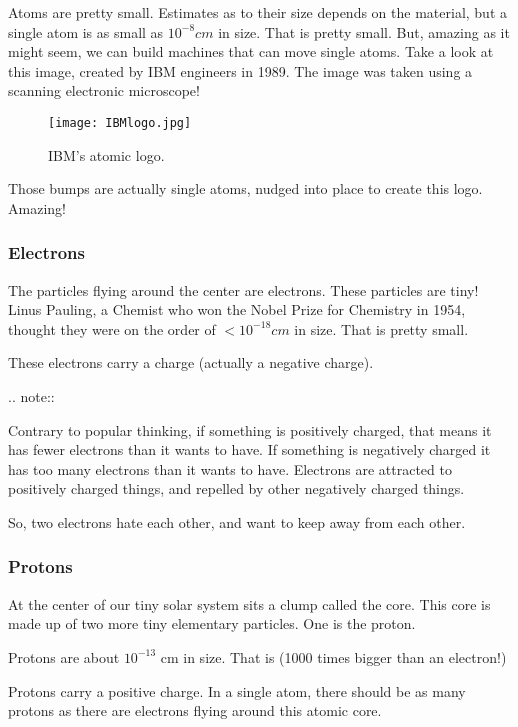 Atoms are pretty small. Estimates as to their size depends on the material, but
a single atom is as small as $10^{-8}cm$ in size. That is pretty small.
But, amazing as it might seem, we can build machines that can move single
atoms. Take a look at this image, created by IBM engineers in 1989. The image
was taken using a scanning electronic microscope!

\begin{figure}[ht]
  \caption{IBM's atomic logo.}
  \centering
  \texttt{[image: IBMlogo.jpg]}
\end{figure}

Those bumps are actually single atoms, nudged into place to create this logo.
Amazing!

\subsubsection{Electrons}

The particles flying around the center are electrons.  These particles are
tiny! Linus Pauling, a Chemist who won the Nobel Prize for Chemistry in 1954,
thought they were on the order of $< 10^{-18}cm$ in size. That is pretty
small.

These electrons carry a charge (actually a negative charge). 

..  note::

    Contrary to popular thinking, if something is positively charged, that
    means it has fewer electrons than it wants to have. If something is
    negatively charged it has too many electrons than it wants to have.
    Electrons are attracted to positively charged things, and repelled
    by other negatively charged things.

    So, two electrons hate each other, and want to keep away from each
    other.

\subsubsection{Protons}

At the center of our tiny solar system sits a clump called the core. This
core is made up of two more tiny elementary particles. One is the
proton.

Protons are about $10^{-13}$ cm in size. That is
(1000 times bigger than an electron!)

Protons carry a positive charge. In a single atom, there should be as
many protons as there are electrons flying around this atomic core. 

